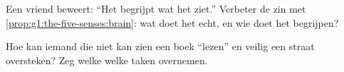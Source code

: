 \begin{exercise}[$\star\star$]\label{exo:g1:the-five-senses:9}
Een vriend beweert: ``Het  begrijpt wat het ziet.'' Verbeter de zin
met \cref{prop:g1:the-five-senses:brain}: wat doet het  echt, en wie
doet het begrijpen?
\end{exercise}

\begin{exercise}[$\star\star$]\label{exo:g1:the-five-senses:10}
Hoe kan iemand die niet kan zien een boek ``lezen'' en veilig een
straat oversteken? Zeg welke  welke taken overnemen.
\end{exercise}
